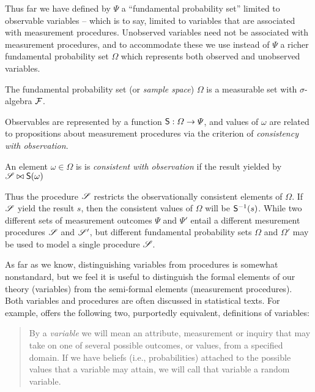 Thus far we have defined by $\Psi$ a ``fundamental probability set'' limited to observable variables -- which is to say, limited to variables that are associated with measurement procedures. Unobserved variables need not be associated with measurement procedures, and to accommodate these we use instead of $\Psi$ a richer fundamental probability set $\Omega$ which represents both observed and unobserved variables.

\begin{definition}
The fundamental probability set (or \emph{sample space}) $\Omega$ is a measurable set with $\sigma$-algebra $\mathcal{F}$.
\end{definition}

Observables are represented by a function $\mathsf{S}:\Omega\to \Psi$, and values of $\omega$ are related to propositions about measurement procedures via the criterion of \emph{consistency with observation}.

\begin{definition}\label{def:observable}
An element $\omega\in \Omega$ is is \emph{consistent with observation} if the result yielded by $\mathscr{S}\bowtie \mathsf{S}(\omega)$
\end{definition}

Thus the procedure $\mathscr{S}$ restricts the observationally consistent elements of $\Omega$. If $\mathscr{S}$ yield the result $s$, then the consistent values of $\Omega$ will be $\mathsf{S}^{-1}(s)$. While two different sets of measurement outcomes $\Psi$ and $\Psi'$ entail a different mesurement procedures $\mathscr{S}$ and $\mathscr{S}'$, but different fundamental probability sets $\Omega$ and $\Omega'$ may be used to model a single procedure $\mathscr{S}$.

As far as we know, distinguishing variables from procedures is somewhat nonstandard, but we feel it is useful to distinguish the formal elements of our theory (variables) from the semi-formal elements (measurement procedures). Both variables and procedures are often discussed in statistical texts. For example, \citet{pearl_causality:_2009} offers the following two, purportedly equivalent, definitions of variables:
\begin{quote}
By a \emph{variable} we will mean an attribute, measurement or inquiry that may take on one of several possible outcomes, or values, from a specified domain. If we have beliefs (i.e., probabilities) attached to the possible values that a variable may attain, we will call that variable a random variable.
\end{quote}

